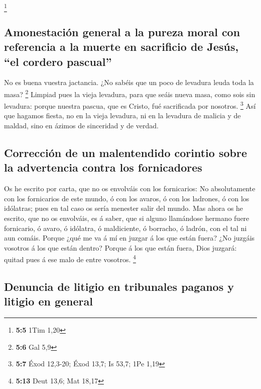 \footnote{\textbf{5:5} 1Tim 1,20}

\hypertarget{amonestaciuxf3n-general-a-la-pureza-moral-con-referencia-a-la-muerte-en-sacrificio-de-jesuxfas-el-cordero-pascual}{%
\subsection{Amonestación general a la pureza moral con referencia a la
muerte en sacrificio de Jesús, ``el cordero
pascual''}\label{amonestaciuxf3n-general-a-la-pureza-moral-con-referencia-a-la-muerte-en-sacrificio-de-jesuxfas-el-cordero-pascual}}

 No es buena vuestra jactancia. ¿No sabéis que un poco de
levadura leuda toda la masa? \footnote{\textbf{5:6} Gal 5,9}
 Limpiad pues la vieja levadura, para que seáis nueva masa,
como sois sin levadura: porque nuestra pascua, que es Cristo, fué
sacrificada por nosotros. \footnote{\textbf{5:7} Éxod 12,3-20; Éxod
  13,7; Is 53,7; 1Pe 1,19}  Así que hagamos fiesta, no en la
vieja levadura, ni en la levadura de malicia y de maldad, sino en ázimos
de sinceridad y de verdad.

\hypertarget{correcciuxf3n-de-un-malentendido-corintio-sobre-la-advertencia-contra-los-fornicadores}{%
\subsection{Corrección de un malentendido corintio sobre la advertencia
contra los
fornicadores}\label{correcciuxf3n-de-un-malentendido-corintio-sobre-la-advertencia-contra-los-fornicadores}}

 Os he escrito por carta, que no os envolváis con los
fornicarios:  No absolutamente con los fornicarios de este
mundo, ó con los avaros, ó con los ladrones, ó con los idólatras; pues
en tal caso os sería menester salir del mundo.  Mas ahora
os he escrito, que no os envolváis, es á saber, que si alguno llamándose
hermano fuere fornicario, ó avaro, ó idólatra, ó maldiciente, ó
borracho, ó ladrón, con el tal ni aun comáis.  Porque ¿qué
me va á mí en juzgar á los que están fuera? ¿No juzgáis vosotros á los
que están dentro?  Porque á los que están fuera, Dios
juzgará: quitad pues á ese malo de entre vosotros. \footnote{\textbf{5:13}
  Deut 13,6; Mat 18,17}

\hypertarget{denuncia-de-litigio-en-tribunales-paganos-y-litigio-en-general}{%
\subsection{Denuncia de litigio en tribunales paganos y litigio en
general}\label{denuncia-de-litigio-en-tribunales-paganos-y-litigio-en-general}}


